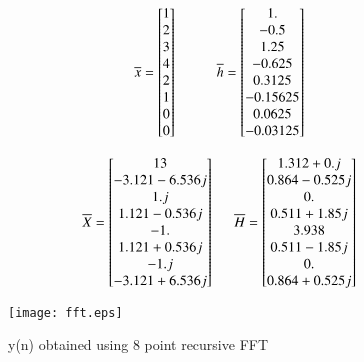 \documentclass[journal,12pt,twocolumn]{IEEEtran}
\renewcommand\thesection{\arabic{section}}
\begin{document}
\begin{enumerate}[label=\thesection.\arabic*.,ref=\thesection.\theenumi]
\begin{equation}
\overline{x} =
\begin{bmatrix}
1\\2\\3\\4\\2\\1\\0\\0
\end{bmatrix} \hspace{10mm} 
\overline{h} =
\begin{bmatrix}
1. \\     -0.5 \\     1.25 \\   -0.625 \\   0.3125 \\ -0.15625 \\ 0.0625\\  -0.03125
\end{bmatrix}
\end{equation}


\begin{equation}
    \overline{X} =
\begin{bmatrix}
 13 \\   -3.121-6.536j \\  1.j \\     1.121-0.536j \\ -1.\\1.121+0.536j\\ -1.j\\    -3.121+6.536j
\end{bmatrix}
 \hspace{5mm}  \overline{H} =
\begin{bmatrix}
1.312+0.j \\    0.864-0.525j \\ 0.  \\    0.511+1.85j \\ 3.938 \\
 0.511-1.85j \\  0.  \\    0.864+0.525j
\end{bmatrix}
\end{equation}

\begin{figure}[!ht]

	\texttt{[image: fft.eps]}
	\caption{y(n) obtained using 8 point recursive FFT}
\end{figure}
\bigskip


\end{enumerate}
\end{document}
